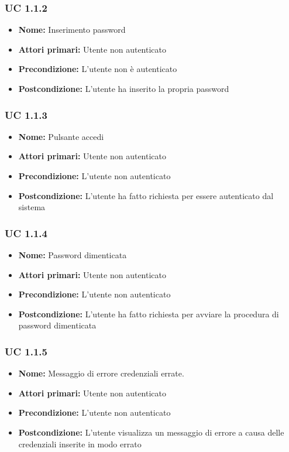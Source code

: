 \documentclass[a4paper, oneside, dvipsnames, table]{article} %
\begin{document}
\subsubsection{UC 1.1.2}%
\begin{itemize}
\item \textbf{Nome:} Inserimento password
\item \textbf{Attori primari:} Utente non autenticato
\item \textbf{Precondizione:} L’utente non è autenticato
\item \textbf{Postcondizione:} L’utente ha inserito la propria password
\end{itemize}

\subsubsection{UC 1.1.3}%
\begin{itemize}
\item \textbf{Nome:} Pulsante accedi
\item \textbf{Attori primari:} Utente non autenticato
\item \textbf{Precondizione:} L'utente non autenticato
\item \textbf{Postcondizione:} L'utente ha fatto richiesta per essere autenticato dal sistema 
\end{itemize}

\subsubsection{UC 1.1.4}%
\begin{itemize}
\item \textbf{Nome:} Password dimenticata
\item \textbf{Attori primari:} Utente non autenticato
\item \textbf{Precondizione:}  L'utente non autenticato
\item \textbf{Postcondizione:} L'utente ha fatto richiesta per avviare la procedura di password dimenticata
\end{itemize}

\subsubsection{UC 1.1.5}%
\begin{itemize}
\item \textbf{Nome:} Messaggio di errore credenziali errate.
\item \textbf{Attori primari:} Utente non autenticato
\item \textbf{Precondizione:}  L'utente non autenticato
\item \textbf{Postcondizione:} L'utente visualizza un messaggio di errore a causa delle credenziali inserite in modo errato
\end{itemize}
\end{document}
